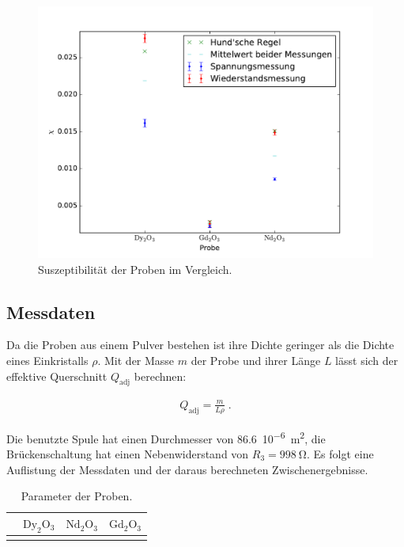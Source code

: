 		\begin{figure}[H]
			\centering
			\includegraphics[width=\textwidth]{../plots/chi.pdf}
			\caption{Suszeptibilität der Proben im Vergleich.}
			\label{fig:_plots_chi_pdf}
		\end{figure}



	\subsection{Messdaten}
	\label{sub:messdaten}
		Da die Proben aus einem Pulver bestehen ist ihre Dichte geringer als die Dichte eines Einkristalls $\rho$. Mit der Masse $m$ der Probe und ihrer Länge $L$
		lässt sich der effektive Querschnitt $Q_\text{adj}$ berechnen:

			\begin{align*}
				Q_\text{adj} = \frac{m}{L \rho} \;.
			\end{align*}

		Die benutzte Spule hat einen Durchmesser von \SI{86.6}{10^{-6}\m^2}, die Brückenschaltung hat einen Nebenwiderstand von $R_3=\SI{998}{\ohm}$.
		Es folgt eine Auflistung der Messdaten und der daraus berechneten Zwischenergebnisse.

		\begin{table}[H]
		    \centering
		    \caption{Parameter der Proben.}
		    \label{tab:seern}
		    \begin{adjustbox}{center}
		    \begin{tabular}{
		    	l
		        S
		        S
		        S}
		     \toprule
		      &
		      &
		      &
		      \\
		     \midrule
		     \bottomrule
		    \end{tabular}
		    \end{adjustbox}
		\end{table}


